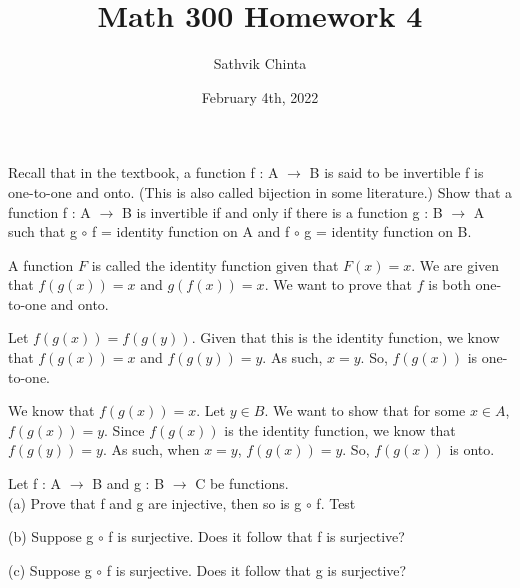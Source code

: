 \documentclass[addpoints]{exam}
\title{Math 300 Homework 4}
\author{Sathvik Chinta}
\date{February 4th, 2022}
\begin{document}
\maketitle

\begin{questions}
\question Recall that in the textbook, a function f : A $\rightarrow$ B is said to be
invertible f is one-to-one and onto. (This is also called bijection in some literature.)
Show that a function f : A $\rightarrow$ B is invertible if and only if there is a function g :
B $\rightarrow$ A such that g $\circ$ f = identity function on A and f $\circ$ g = identity 
function on B.

A function $F$ is called the identity function given that $F(x) = x$. We are given that $f(g(x)) 
= x$ and $g(f(x)) = x$. We want to prove that $f$ is both one-to-one and onto. 

Let $f(g(x)) = f(g(y))$. Given that this is the identity function, we know that $f(g(x)) = x$ 
and $f(g(y)) = y$. As such, $x = y$. So, $f(g(x))$ is one-to-one. 

We know that $f(g(x)) = x$. Let $y \in B$. We want to show that for some $x \in A$, $f(g(x)) = y$.
Since $f(g(x))$ is the identity function, we know that $f(g(y)) = y$. As such, when $x = y$, 
$f(g(x)) = y$. So, $f(g(x))$ is onto.

\question Let f : A $\rightarrow$ B and g : B $\rightarrow$ C be functions.\\
(a) Prove that f and g are injective, then so is g $\circ$ f. Test

(b) Suppose g $\circ$ f is surjective. Does it follow that f is surjective?

(c) Suppose g $\circ$ f is surjective. Does it follow that g is surjective?

\end{questions}
\end{document}
